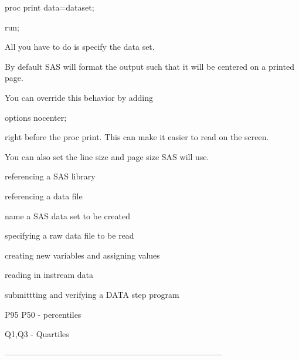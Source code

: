 proc print data=dataset;

 run;

 

All you have to do is specify the data set.

 

By default SAS will format the output such that it will be centered on a printed page.

You can override this behavior by adding

 

options nocenter;

 

right before the proc print. This can make it easier to read on the screen.

You can also set the line size and page size SAS will use.



referencing a SAS library

referencing a data file

name a SAS data set to be created

specifying a raw data file to be read

creating new variables and assigning values


reading in instream data

submittting and verifying a DATA step program



P95 P50 -  percentiles

Q1,Q3 - Quartiles

--------------------------------------------------------------------------------



 



